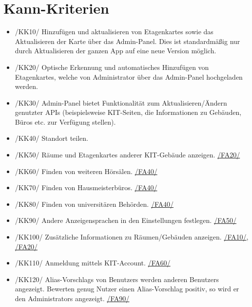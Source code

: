 \section{Kann-Kriterien}

\begin{itemize}

    \item{/KK10/} \label{/KK10/} Hinzufügen und aktualisieren von \Glspl{Etagenkarte} sowie das Aktualisieren der \Gls{Karte} über das \Gls{Admin-Panel}.
        Dies ist standardmäßig nur durch Aktualisieren der ganzen App auf eine neue Version möglich.
    \item{/KK20/} \label{/KK20/} Optische Erkennung und automatisches Hinzufügen von \Glspl{Etagenkarte},
          welche von \Gls{Administrator} über das \Gls{Admin-Panel} hochgeladen werden.
          
    \item{/KK30/} \label{/KK30/} \Gls{Admin-Panel} bietet Funktionalität zum Aktualisieren/Ändern genutzter \Gls{API}s (beispielsweise \Gls{KIT}-Seiten, die Informationen zu Gebäuden, Büros etc. zur Verfügung stellen).
    \item{/KK40/} \label{/KK40/} Standort teilen.
    \item{/KK50/} \label{/KK50/} Räume und \Glspl{Etagenkarte} anderer \Gls{KIT}-Gebäude anzeigen. \hyperref[/FA20/]{/FA20/}
    \item{/KK60/} \label{/KK60/} Finden von weiteren Hörsälen. \hyperref[/FA40/]{/FA40/}
    \item{/KK70/} \label{/KK70/} Finden von Hausmeisterbüros. \hyperref[/FA40/]{/FA40/}
    \item{/KK80/} \label{/KK80/} Finden von universitären Behörden. \hyperref[/FA40/]{/FA40/}
    \item{/KK90/} \label{/KK90/} Andere Anzeigensprachen in den Einstellungen festlegen. \hyperref[/FA50/]{/FA50/}
    \item{/KK100/} \label{/KK100/} Zusätzliche Informationen zu Räumen/Gebäuden anzeigen. \hyperref[/FA10/]{/FA10/}, \hyperref[/FA20/]{/FA20/}
    \item{/KK110/} \label{/KK110/} Anmeldung mittels \Gls{KIT}-Account. \hyperref[/FA60/]{/FA60/}
    \item{/KK120/} \label{/KK120/} \Glspl{Alias-Vorschlag} von \Glspl{Benutzer} werden anderen \Glspl{Benutzer} angezeigt. Bewerten genug Nutzer einen 
    \Gls{Alias-Vorschlag} positiv, so wird er den \Glspl{Administrator} angezeigt. \hyperref[/FA90/]{/FA90/}
    
        

\end{itemize}
